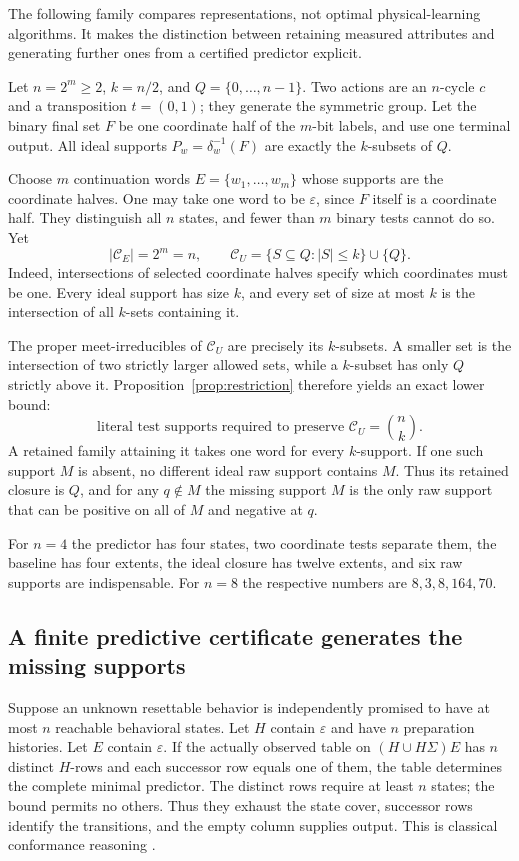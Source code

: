 \documentclass[11pt]{article}
\theoremstyle{remark}
\newcommand{\eps}{\varepsilon}
\newcommand{\C}{\mathcal C}
\begin{document}
The following family compares representations, not optimal physical-learning algorithms. It makes the distinction between retaining measured attributes and generating further ones from a certified predictor explicit.

Let $n=2^m\ge2$, $k=n/2$, and $Q=\{0,\ldots,n-1\}$. Two actions are an $n$-cycle $c$ and a transposition $t=(0,1)$; they generate the symmetric group. Let the binary final set $F$ be one coordinate half of the $m$-bit labels, and use one terminal output. All ideal supports $P_w=\delta_w^{-1}(F)$ are exactly the $k$-subsets of $Q$.

Choose $m$ continuation words $E=\{w_1,\ldots,w_m\}$ whose supports are the coordinate halves. One may take one word to be $\eps$, since $F$ itself is a coordinate half. They distinguish all $n$ states, and fewer than $m$ binary tests cannot do so. Yet
\[
 |\C_E|=2^m=n,
 \qquad
 \C_U=\{S\subseteq Q:|S|\le k\}\cup\{Q\}.
\]
Indeed, intersections of selected coordinate halves specify which coordinates must be one. Every ideal support has size $k$, and every set of size at most $k$ is the intersection of all $k$-sets containing it.

The proper meet-irreducibles of $\C_U$ are precisely its $k$-subsets. A smaller set is the intersection of two strictly larger allowed sets, while a $k$-subset has only $Q$ strictly above it. Proposition~\ref{prop:restriction} therefore yields an exact lower bound:
\[
 \text{literal test supports required to preserve }\C_U
 =\binom nk.
\]
A retained family attaining it takes one word for every $k$-support. If one such support $M$ is absent, no different ideal raw support contains $M$. Thus its retained closure is $Q$, and for any $q\notin M$ the missing support $M$ is the only raw support that can be positive on all of $M$ and negative at $q$.

For $n=4$ the predictor has four states, two coordinate tests separate them, the baseline has four extents, the ideal closure has twelve extents, and six raw supports are indispensable. For $n=8$ the respective numbers are $8,3,8,164,70$.

\subsection{A finite predictive certificate generates the missing supports}
\label{sec:certificate}

Suppose an unknown resettable behavior is independently promised to have at most $n$ reachable behavioral states. Let $H$ contain $\eps$ and have $n$ preparation histories. Let $E$ contain $\eps$. If the actually observed table on $(H\cup H\Sigma)E$ has $n$ distinct $H$-rows and each successor row equals one of them, the table determines the complete minimal predictor. The distinct rows require at least $n$ states; the bound permits no others. Thus they exhaust the state cover, successor rows identify the transitions, and the empty column supplies output. This is classical conformance reasoning \cite{Chow}.
\end{document}
